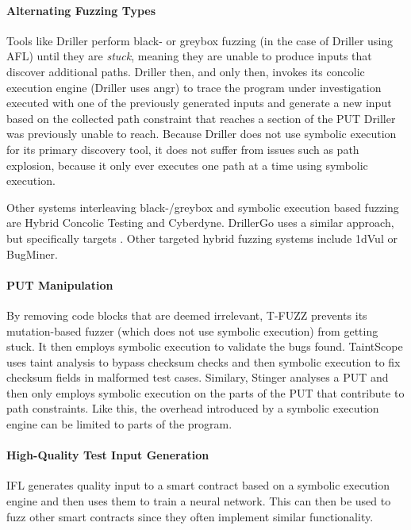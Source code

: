 \documentclass{article}
\begin{document}
\begin{multicols}{2}
    \paragraph{Alternating Fuzzing Types} Tools like Driller\cite{Driller} perform black- or greybox fuzzing (in the case of Driller using AFL\cite{AFLPlusPlus}) until they are \textit{stuck}, meaning they are unable to produce inputs that discover additional paths. Driller then, and only then, invokes its concolic execution engine (Driller uses angr\cite{angr}) to trace the program under investigation executed with one of the previously generated inputs and generate a new input based on the collected path constraint that reaches a section of the PUT Driller was previously unable to reach. Because Driller does not use symbolic execution for its primary discovery tool, it does not suffer from issues such as path explosion, because it only ever executes one path at a time using symbolic execution.

    Other systems interleaving black-/greybox and symbolic execution based fuzzing are Hybrid Concolic Testing\cite{HCT} and Cyberdyne\cite{Cyberdyne}. DrillerGo\cite{DrillerGo} uses a similar approach, but specifically targets \cite{DrillerGo}. Other targeted hybrid fuzzing systems include 1dVul\cite{1dVul} or BugMiner\cite{BugMiner}.

    \paragraph{PUT Manipulation} By removing code blocks that are deemed irrelevant, T-FUZZ\cite{TFuzz} prevents its mutation-based fuzzer (which does not use symbolic execution) from getting stuck. It then employs symbolic execution to validate the bugs found. TaintScope\cite{TaintScope} uses taint analysis to bypass checksum checks and then symbolic execution to fix checksum fields in malformed test cases. Similary, Stinger\cite{Stinger} analyses a PUT and then only employs symbolic execution on the parts of the PUT that contribute to path constraints. Like this, the overhead introduced by a symbolic execution engine can be limited to parts of the program.

    \paragraph{High-Quality Test Input Generation} IFL\cite{IFL} generates quality input to a smart contract based on a symbolic execution engine and then uses them to train a neural network. This can then be used to fuzz other smart contracts since they often implement similar functionality.


\end{multicols}
\end{document}
